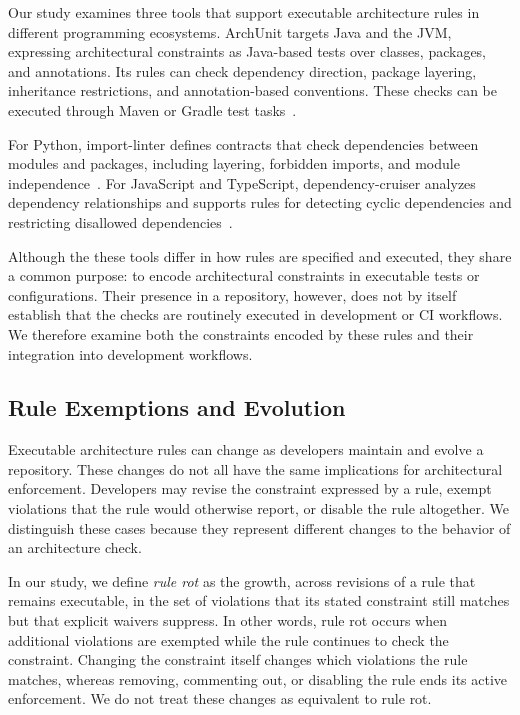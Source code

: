 {Our study examines three tools that support executable architecture
rules in different programming ecosystems. ArchUnit targets Java and
the JVM, expressing architectural constraints as Java-based tests
over classes, packages, and annotations. Its rules can check dependency
direction, package layering, inheritance restrictions, and
annotation-based conventions. These checks can be executed through
Maven or Gradle test tasks~\cite{archunit}.

For Python, import-linter defines contracts that check dependencies
between modules and packages, including layering, forbidden imports,
and module independence~\cite{importlinter}. For JavaScript and
TypeScript, dependency-cruiser analyzes dependency relationships and
supports rules for detecting cyclic dependencies and restricting
disallowed dependencies~\cite{depcruise}.

Although the these tools differ in how rules are specified and
executed, they share a common purpose: to encode architectural
constraints in executable tests or configurations. Their presence
in a repository, however, does not by itself establish that the checks
are routinely executed in development or CI workflows. We therefore
examine both the constraints encoded by these rules and their
integration into development workflows.

\subsection{Rule Exemptions and Evolution}

Executable architecture rules can change as developers maintain
and evolve a repository. These changes do not all have the same
implications for architectural enforcement. Developers may revise
the constraint expressed by a rule, exempt violations that the rule
would otherwise report, or disable the rule altogether. We distinguish
these cases because they represent different changes to the behavior
of an architecture check.

In our study, we define \emph{rule rot} as the growth, across revisions
of a rule that remains executable, in the set of violations that its
stated constraint still matches but that explicit waivers suppress.
In other words, rule rot occurs when additional violations are exempted
while the rule continues to check the constraint. Changing the
constraint itself changes which violations the rule matches, whereas
removing, commenting out, or disabling the rule ends its active
enforcement. We do not treat these changes as equivalent to rule rot.

}
